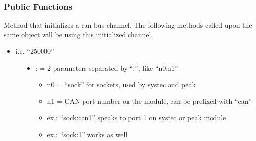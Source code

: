 \documentclass[letterpaper,10pt,english]{sphinxmanual}
\begin{document}
\begin{fulllineitems}
\label{\detokenize{vendors/systec:_CPPv412CSockCanScan}}%
\pysigstartmultiline
{}\label{\detokenize{vendors/systec:classCSockCanScan}}%
\pysigstopmultiline~\subsubsection*{Public Functions}

\begin{fulllineitems}
\label{\detokenize{vendors/systec:_CPPv4N12CSockCanScan9createBusEK6string6string}}%
\pysigstartmultiline
{}\label{\detokenize{vendors/systec:classCSockCanScan_1ac5c669f96d2d6cf7387f8a646bd65b3f}}%
\pysigstopmultiline
Method that initializes a can bus channel. The following methods called upon the same object will be using this initialized channel.

\begin{itemize}
\item {} 
i.e. “250000”

\end{itemize}
\begin{description}
\item[{}] \leavevmode\begin{itemize}
\item {} 
: = 2 parameters separated by “:”, like “n0:n1”\begin{itemize}
\item {} 
n0 = “sock” for sockets, used by systec and peak

\item {} 
n1 = CAN port number on the module, can be prefixed with “can”

\item {} 
ex.: “sock:can1” speaks to port 1 on systec or peak module

\item {} 
ex.: “sock:1” works as well


\end{itemize}
\end{itemize}
\end{description}
\end{fulllineitems}
\end{fulllineitems}
\end{document}
